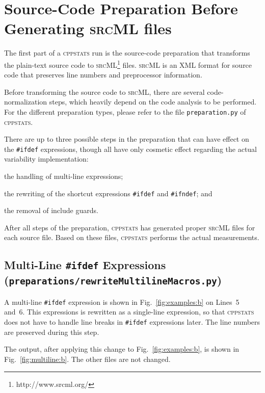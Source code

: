\documentclass[a4paper]{scrartcl}
\newcommand\code[1]{\texttt{#1}}
\newcommand\tool[1]{\textsc{#1}}
\newcommand\ifdeff[1]{\code{\##1}\xspace}
\newcommand\ifdef[0]{{\upshape\ifdeff{ifdef}}\xspace}
\newcommand\cppstats[0]{\tool{cppstats}\xspace}
\begin{document}
\section{Source-Code Preparation Before Generating \tool{srcML} files}
\label{sec:preparation}

The first part of a \cppstats run is the source-code preparation that transforms the plain-text source code to \tool{srcML}\footnote{http://www.srcml.org/} files.
\tool{srcML} is an XML format for source code that preserves line numbers and preprocessor information.

Before transforming the source code to \tool{srcML}, there are several code-normalization steps, which heavily depend on the code analysis to be performed.
For the different preparation types, please refer to the file \code{preparation.py} of \cppstats.

There are up to three possible steps in the preparation that can have effect on the \ifdef expressions, though all have only cosmetic effect regarding the actual variability implementation:
\begin{inparaenum}[\itshape 1\upshape)]
\item the handling of multi-line expressions;
\item the rewriting of the shortcut expressions \ifdeff{ifdef} and \ifdeff{ifndef}; and
\item the removal of include guards.
\end{inparaenum}

After all steps of the preparation, \cppstats has generated proper \tool{srcML} files for each source file.
Based on these files, \cppstats performs the actual measurements.


\subsection{Multi-Line \ifdef Expressions {\footnotesize (\code{preparations/rewriteMultilineMacros.py})}}

A multi-line \ifdef expression is shown in Fig.\ \ref{fig:examples:b} on Lines~5 and~6.
This expressions is rewritten as a single-line expression, so that \cppstats does not have to handle line breaks in \ifdef expressions later.
The line numbers are preserved during this step.

The output, after applying this change to Fig.\ \ref{fig:examples:b}, is shown in Fig.\ \ref{fig:multiline:b}.
The other files are not changed.
\end{document}
